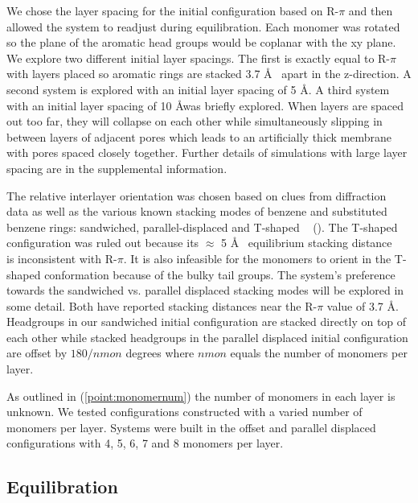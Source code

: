 \documentclass{article}
\newcommand{\angstrom}{\textup{\AA}}
\begin{document}
  We chose the layer spacing for the initial configuration based on R-$\pi$ and
  then allowed the system to readjust during equilibration. Each monomer was rotated
  so the plane of the aromatic head groups would be coplanar with the xy plane.
  We explore two different initial layer spacings. The first is exactly equal to
  R-$\pi$ with layers placed so aromatic rings are stacked 3.7 \angstrom~ apart
  in the z-direction. A second system is explored with an initial layer spacing
  of 5 \angstrom. A third system with an initial layer spacing of 10 \angstrom was
  briefly explored. When layers are spaced out too far, they will collapse
  on each other while simultaneously slipping in between layers of adjacent pores
  which leads to an artificially thick membrane with pores spaced closely
  together. 
  Further details of simulations with large layer spacing are in the supplemental information.

  The relative interlayer orientation was chosen based on clues from
  diffraction data as well as the various known stacking modes of benzene and
  substituted benzene rings: sandwiched, parallel-displaced and T-shaped
  ~\cite{sinnokrot_estimates_2002} ().
  The T-shaped configuration was ruled out because its $\approx$ 5 \angstrom~
  equilibrium stacking distance ~\cite{sinnokrot_estimates_2002} is inconsistent
  with R-$\pi$. It is also infeasible for the monomers to orient in the T-shaped
  conformation because of the bulky tail groups. The system's preference towards
  the sandwiched vs. parallel displaced stacking modes will be explored in some
  detail.  Both have reported stacking distances near the R-$\pi$ value of 3.7
  \angstrom. Headgroups in our sandwiched initial configuration are stacked
  directly on top of each other while stacked headgroups in the parallel
  displaced initial configuration are offset by $180/nmon$ degrees where $nmon$
  equals the number of monomers per layer.

  As outlined in (\ref{point:monomernum}) the number of monomers in each layer is
  unknown. We tested configurations constructed with a varied number of
  monomers per layer. Systems were built in the offset and parallel displaced
  configurations with 4, 5, 6, 7 and 8 monomers per layer.

  \subsection{Equilibration}
\end{document}
